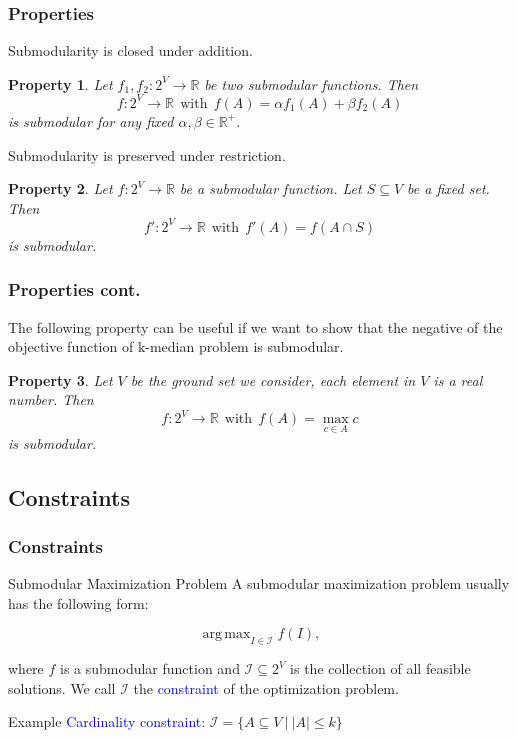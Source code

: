 \documentclass{beamer}
\newtheorem{property}{Property}
\newcommand{\calI}{\mathcal{I}}
\newcommand{\emRed}[1][]{\textcolor{blue} #1}
\newcommand{\bbR}{\mathbb{R}}
\DeclareMathOperator*{\argmax}{arg\,max}
\begin{document}
\begin{frame}
\frametitle{Properties}

Submodularity is closed under addition.
\begin{property}
  \label{prop:addition}
  Let $f_1, f_2: 2^V \rightarrow \bbR$ be two submodular functions. Then 
  $$f: 2^V\rightarrow \bbR~~\text{with}~~ f(A) = \alpha f_1(A) + \beta f_2(A)$$ 
is submodular for any fixed $\alpha, \beta \in \bbR^+$.
\end{property}
\pause
Submodularity is preserved under restriction.
\begin{property}
  \label{prop:restriction}
  Let $f: 2^V \rightarrow \bbR$ be a submodular function. Let $S\subseteq V$ be a fixed set. Then
$$f':2^V \rightarrow \bbR~~\text{with}~~f'(A) = f(A\cap S)$$
is submodular.
\end{property}
\end{frame}


\begin{frame}
\frametitle{Properties cont.}
The following property can be useful if we want to show that the negative of the objective function of k-median problem is submodular.
\begin{property}
  \label{prop:max}
Let $V$ be the ground set we consider, each element in $V$ is a real number.  Then 
$$f:2^V \rightarrow \bbR~~\text{with}~~ f(A) = \max_{c\in A}c$$ 
is submodular.
\end{property}
\end{frame}



\subsection{Constraints}
\begin{frame}
\frametitle{Constraints}
\begin{block}{Submodular Maximization Problem}
A submodular maximization problem usually has the following form:

\begin{equation}
  \label{eq:optimization}
  \argmax_{I\in\calI} f(I),
\end{equation}
\end{block}
where $f$ is a submodular function and $\calI \subseteq 2^V$ is the collection of all feasible solutions. We call $\calI$ the \emRed{constraint} of the optimization problem.
  \begin{block}{Example}
    \emRed{Cardinality constraint}: $\calI = \{A \subseteq V ~|~ |A| \leq k\}$
  \end{block}
  \pause

\end{frame}
\end{document}
